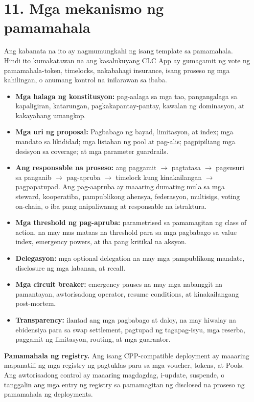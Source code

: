 \documentclass[11pt]{article}
\begin{document}
\section*{11. Mga mekanismo ng pamamahala}

Ang kabanata na ito ay nagmumungkahi ng isang template sa pamamahala. Hindi ito kumakatawan na ang kasalukuyang CLC App ay gumagamit ng vote ng pamamahala-token, timelocks, nakabahagi insurance, isang proseso ng mga kahilingan, o anumang kontrol na inilarawan sa ibaba.

\begin{itemize}[leftmargin=*]
\item \textbf{Mga halaga ng konstitusyon:} pag-aalaga sa mga tao, pangangalaga sa kapaligiran, katarungan, pagkakapantay-pantay, kawalan ng dominasyon, at kakayahang umangkop.
\item \textbf{Mga uri ng proposal:} Pagbabago ng bayad, limitasyon, at index; mga mandato sa likididad; mga listahan ng pool at pag-alis; pagpipiliang mga desisyon sa coverage; at mga parameter guardrails.
\item \textbf{Ang responsable na proseso:} ang paggamit $\to$ pagtatasa $\to$ pagsusuri sa panganib $\to$ pag-apruba $\to$ timelock kung kinakailangan $\to$ pagpapatupad. Ang pag-aapruba ay maaaring dumating mula sa mga steward, kooperatiba, pampublikong ahensya, federasyon, multisigs, voting on-chain, o iba pang naipaliwanag at responsable na istraktura.
\item \textbf{Mga threshold ng pag-apruba:} parametrised sa pamamagitan ng class of action, na may mas mataas na threshold para sa mga pagbabago sa value index, emergency powers, at iba pang kritikal na aksyon.
\item \textbf{Delegasyon:} mga optional delegation na may mga pampublikong mandate, disclosure ng mga labanan, at recall.
\item \textbf{Mga circuit breaker:} emergency pauses na may mga nabanggit na pamantayan, awtorisadong operator, resume conditions, at kinakailangang post-mortem.
\item \textbf{Transparency:} ilantad ang mga pagbabago at daloy, na may hiwalay na ebidensiya para sa swap settlement, pagtupad ng tagapag-isyu, mga reserba, paggamit ng limitasyon, routing, at mga guarantor.
\end{itemize}
\textbf{Pamamahala ng registry.} Ang isang CPP-compatible deployment ay maaaring mapanatili ng mga registry ng pagtuklas para sa mga voucher, tokens, at Pools. Ang awtorisadong control ay maaaring magdagdag, i-update, suspende, o tanggalin ang mga entry ng registry sa pamamagitan ng disclosed na proseso ng pamamahala ng deployments.
\end{document}
